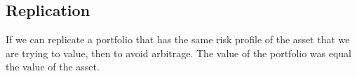 \begin{derivation}
\end{derivation}

\begin{example}
\end{example}

\subsection{Replication}
\begin{intuition}
    If we can replicate a portfolio that has the same risk profile of the asset that we are trying to value, then to avoid arbitrage. The value of the portfolio was equal the value of the asset.    
\end{intuition}

